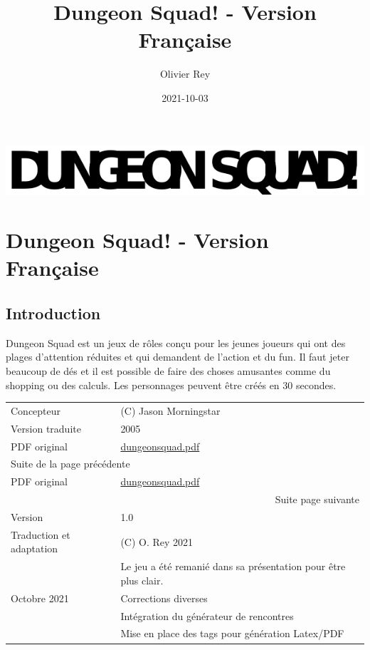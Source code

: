 \documentclass[a4paper, 11pt, twoside]{article}
\author{Olivier Rey}
\date{2021-10-03}
\title{Dungeon Squad! - Version Française}
\begin{document}
\maketitle
\tableofcontents

\newpage

\begin{center}
\includegraphics[width=.9\linewidth]{logo.png}
\end{center}

\section{Dungeon Squad! - Version Française}
\label{sec:org7d05668}

\subsection{Introduction}
\label{sec:org8c93640}

Dungeon Squad est un jeux de rôles conçu pour les jeunes joueurs qui ont des plages d'attention réduites et qui demandent de l'action et du fun. Il faut jeter beaucoup de dés et il est possible de faire des choses amusantes comme du shopping ou des calculs. Les personnages peuvent être créés en 30 secondes.

\begin{longtable}{|l|l|}
\hline
Concepteur & (C) Jason Morningstar\\
Version traduite & 2005\\
PDF original & \href{https://github.com/orey/jdr/blob/master/DungeonSquad-fr/dungeon\_squad.pdf}{dungeonsquad.pdf}\\
\hline
\endfirsthead
\multicolumn{2}{l}{Suite de la page précédente} \\

PDF original & \href{https://github.com/orey/jdr/blob/master/DungeonSquad-fr/dungeon\_squad.pdf}{dungeonsquad.pdf} \\

\hline
\endhead
\hline\multicolumn{2}{r}{Suite page suivante} \\
\endfoot
\endlastfoot
\hline
Version & 1.0\\
\hline
Traduction et adaptation & (C) O. Rey 2021\\
 & Le jeu a été remanié dans sa présentation pour être plus clair.\\
Octobre 2021 & Corrections diverses\\
 & Intégration du générateur de rencontres\\
 & Mise en place des tags pour génération Latex/PDF\\
\hline
\end{longtable}
\end{document}
